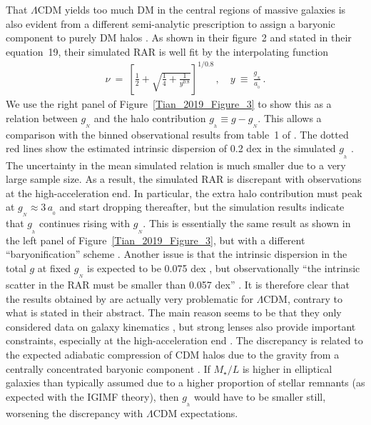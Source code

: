 \documentclass[fleqn,usenatbib,useAMS,onecolumn]{mnras} %
\begin{document}
That $\Lambda$CDM yields too much DM in the central regions of massive galaxies is also evident from a different semi-analytic prescription to assign a baryonic component to purely DM halos \citep{Paranjape_2021}. As shown in their figure~2 and stated in their equation~19, their simulated RAR is well fit by the interpolating function
\begin{eqnarray}
    \nu ~=~ \left[ \frac{1}{2} + \sqrt{\frac{1}{4} + \frac{1}{y^{0.8}}} \right]^{1/0.8} \, , \quad y ~\equiv~ \frac{g_{_N}}{a_{_0}} \, .
    \label{nu_Paranjape}
\end{eqnarray}
We use the right panel of Figure~\ref{Tian_2019_Figure_3} to show this as a relation between $g_{_N}$ and the halo contribution $g_{_h} \equiv g - g_{_N}$. This allows a comparison with the binned observational results from table~1 of \citet{Tian_2019}. The dotted red lines show the estimated intrinsic dispersion of 0.2 dex in the simulated $g_{_h}$ \citep[section~4.1 of][]{Paranjape_2021}. The uncertainty in the mean simulated relation is much smaller due to a very large sample size. As a result, the simulated RAR is discrepant with observations at the high-acceleration end. In particular, the extra halo contribution must peak at $g_{_N} \approx 3 \, a_{_0}$ and start dropping thereafter, but the simulation results indicate that $g_{_h}$ continues rising with $g_{_N}$. This is essentially the same result as shown in the left panel of Figure~\ref{Tian_2019_Figure_3}, but with a different ``baryonification'' scheme \citep{Paranjape_2021_SAM}. Another issue is that the intrinsic dispersion in the total $g$ at fixed $g_{_N}$ is expected to be 0.075 dex \citep{Paranjape_2021}, but observationally ``the intrinsic scatter in the RAR must be smaller than 0.057 dex'' \citep[section~4.1 of][]{Li_2018}. It is therefore clear that the results obtained by \citet{Paranjape_2021} are actually very problematic for $\Lambda$CDM, contrary to what is stated in their abstract. The main reason seems to be that they only considered data on galaxy kinematics \citep{Chae_2019}, but strong lenses also provide important constraints, especially at the high-acceleration end \citep[Section~\ref{Strong_lensing}; see also section~2 of][]{Tian_2019}. The discrepancy is related to the expected adiabatic compression of CDM halos due to the gravity from a centrally concentrated baryonic component \citep{Li_2022, Moreno_2022_expansion}. If $M_{\star}/L$ is higher in elliptical galaxies than typically assumed due to a higher proportion of stellar remnants (as expected with the IGIMF theory), then $g_{_h}$ would have to be smaller still, worsening the discrepancy with $\Lambda$CDM expectations.
\end{document}
